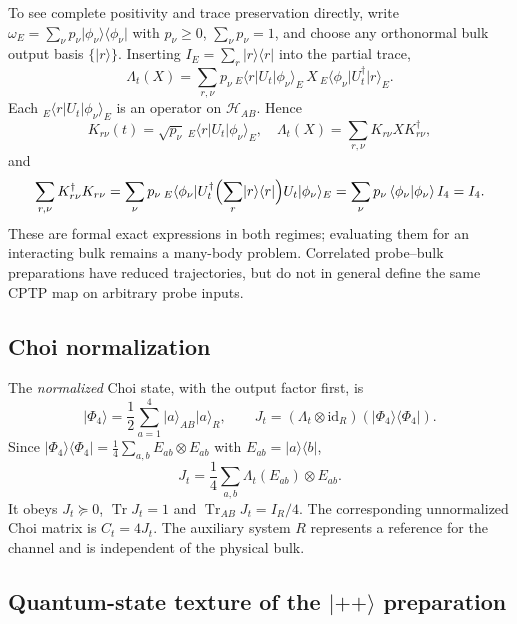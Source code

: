 \documentclass[11pt,a4paper]{article}
\newcommand{\ket}[1]{\lvert #1\rangle}
\newcommand{\bra}[1]{\langle #1\rvert}
\newcommand{\Tr}{\operatorname{Tr}}
\newcommand{\id}{\mathrm{id}}
\newcommand{\HH}{\mathcal H}
\begin{document}
To see complete positivity and trace preservation directly, write
$\omega_E=\sum_\nu p_\nu\ket{\phi_\nu}\bra{\phi_\nu}$ with $p_\nu\ge0$,
$\sum_\nu p_\nu=1$, and choose any orthonormal bulk output basis
$\{\ket r\}$. Inserting $I_E=\sum_r\ket r\bra r$ into the partial trace,
\begin{equation}
 \Lambda_t(X)=\sum_{r,\nu}p_\nu\,{}_E\bra rU_t\ket{\phi_\nu}_E\,X\,
 {}_E\bra{\phi_\nu}U_t^\dagger\ket r_E .
\end{equation}
Each ${}_E\bra rU_t\ket{\phi_\nu}_E$ is an operator on $\HH_{AB}$. Hence
\begin{equation}
 K_{r\nu}(t)=\sqrt{p_\nu}\,{}_E\bra r U_t\ket{\phi_\nu}_E,
 \quad \Lambda_t(X)=\sum_{r,\nu}K_{r\nu}XK_{r\nu}^\dagger,
 \label{eq:kraus}
\end{equation}
and
\begin{equation}
 \sum_{r,\nu}K_{r\nu}^\dagger K_{r\nu}
 =\sum_\nu p_\nu\,{}_E\bra{\phi_\nu}U_t^\dagger
 \Bigl(\sum_r\ket r\bra r\Bigr)U_t\ket{\phi_\nu}_E
 =\sum_\nu p_\nu\,\langle\phi_\nu|\phi_\nu\rangle\,I_4=I_4 .
 \label{eq:krausTP}
\end{equation}
These are formal exact expressions in both regimes; evaluating them for
an interacting bulk remains a many-body problem. Correlated probe--bulk
preparations have reduced trajectories, but do not in general define
the same CPTP map on arbitrary probe inputs.

\subsection{Choi normalization}

The \emph{normalized} Choi state, with the output factor first, is
\begin{equation}
 \ket{\Phi_4}=\frac12\sum_{a=1}^4\ket a_{AB}\ket a_R,
 \qquad J_t=(\Lambda_t\otimes\id_R)(\ket{\Phi_4}\bra{\Phi_4}).
 \label{eq:choi}
\end{equation}
Since $\ket{\Phi_4}\bra{\Phi_4}=\frac14\sum_{a,b}E_{ab}\otimes E_{ab}$
with $E_{ab}=\ket a\bra b$,
\begin{equation}
 J_t=\frac14\sum_{a,b}\Lambda_t(E_{ab})\otimes E_{ab}.
 \label{eq:choigeneral}
\end{equation}
It obeys $J_t\succeq0$, $\Tr J_t=1$ and
$\Tr_{AB}J_t=I_R/4$. The corresponding unnormalized Choi matrix is
$C_t=4J_t$. The auxiliary system $R$ represents a reference for the
channel and is independent of the physical bulk.

\subsection{Quantum-state texture of the \texorpdfstring{$\ket{++}$}{++} preparation}
\label{sec:texture}
\end{document}
